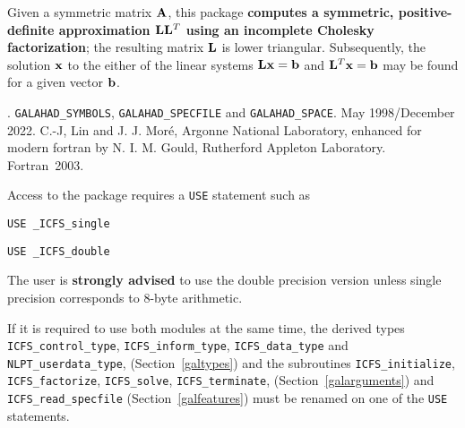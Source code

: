 \documentclass{galahad}
\newcommand{\packagename}{ICFS}
\newcommand{\fullpackagename}{\libraryname\_\packagename}
\begin{document}
\galheader


\galsummary
Given a symmetric matrix ${\mathbf{A}}$, this package
{\bf computes a symmetric, positive-definite approximation
${\mathbf{L}} {\mathbf{L}}^T$ using an incomplete Cholesky factorization}; the
resulting matrix ${\mathbf{L}}$ is lower triangular.
Subsequently, the solution ${\mathbf{x}}$ to the either of the linear systems
${\mathbf{L}} {\mathbf{x}} = {\mathbf{b}}$ and ${\mathbf{L}}^T {\mathbf{x}} = {\mathbf{b}}$
may be found for a given vector ${\mathbf{b}}$.


\galattributes
\galversions{\tt  \fullpackagename\_single, \fullpackagename\_double}.
\galuses
{\tt GALAHAD\_SY\-M\-BOLS},
{\tt GALAH\-AD\-\_\-SP\-ECFILE} and
{\tt GALAHAD\_SPACE}.
\galdate May 1998/December 2022.
\galorigin C.-J, Lin and J. J. Mor\'{e}, Argonne National Laboratory,
enhanced for modern fortran by N. I. M. Gould, Rutherford Appleton Laboratory.
\gallanguage Fortran~2003.


\galhowto


Access to the package requires a {\tt USE} statement such as

\medskip{}

\hspace{8mm} {\tt USE \fullpackagename\_single}

\medskip{}

\hspace{8mm} {\tt USE  \fullpackagename\_double}

\medskip

\noindent
The user is {\bf strongly advised} to use the double
precision version unless single precision corresponds to 8-byte arithmetic.

If it is required to use both modules at the same time, the derived types
{\tt \packagename\_control\_type},
{\tt \packagename\_inform\_type},
{\tt \packagename\_data\_type}
and
{\tt NLPT\_userdata\_type},
(Section~\ref{galtypes})
and the subroutines
{\tt \packagename\_initialize},
{\tt \packagename\_\-factorize},
{\tt \packagename\_\-solve},
{\tt \packagename\_terminate},
(Section~\ref{galarguments})
and
{\tt \packagename\_read\_specfile}
(Section~\ref{galfeatures})
must be renamed on one of the {\tt USE} statements.
\end{document}
